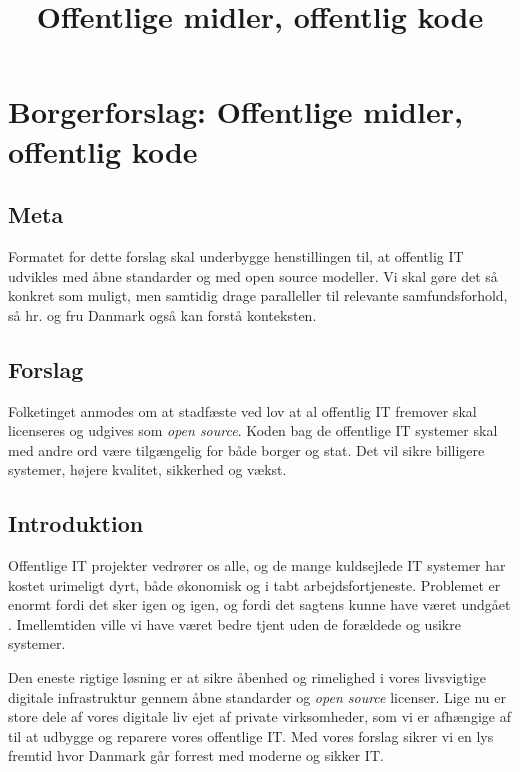\documentclass[fleqn]{article}
\title{Offentlige midler, offentlig kode}
\author{}
\begin{document}
\maketitle

\setcounter{secnumdepth}{0}

\section{Borgerforslag: Offentlige midler, offentlig kode}

\subsection{Meta}
Formatet for dette forslag skal underbygge henstillingen til, at offentlig IT udvikles
med åbne standarder og med open source modeller. Vi skal gøre det så konkret som muligt,
men samtidig drage paralleller til relevante samfundsforhold, så hr. og fru Danmark også 
kan forstå konteksten.

\subsection{Forslag}
\begin{large}
Folketinget anmodes om at stadfæste ved lov at al offentlig IT fremover skal licenseres
og udgives som \textit{open source}. Koden bag de offentlige IT systemer skal med andre ord
være tilgængelig for både borger og stat. Det vil sikre billigere systemer, højere
kvalitet, sikkerhed og vækst.
\end{large}

\subsection{Introduktion}
Offentlige IT projekter vedrører os alle, og de mange kuldsejlede IT systemer har
kostet urimeligt dyrt, både økonomisk og i tabt arbejdsfortjeneste. Problemet er enormt
fordi det sker igen og igen, og fordi det sagtens kunne have været undgået \cite{ITU}.
Imellemtiden ville vi have været bedre tjent uden de forældede og usikre systemer.

Den eneste rigtige løsning er at sikre åbenhed og rimelighed i vores livsvigtige
digitale infrastruktur gennem åbne standarder og \textit{open source} licenser.
Lige nu er store dele af vores digitale liv ejet af private virksomheder, som vi
er afhængige af til at udbygge og reparere vores offentlige IT. Med vores
forslag sikrer vi en lys fremtid hvor Danmark går forrest med moderne og sikker IT.
\end{document}
